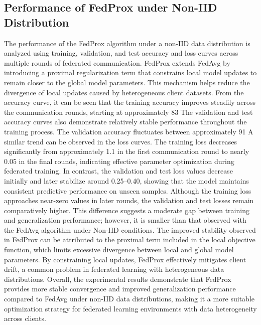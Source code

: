 \documentclass[12pt]{book}
\begin{document}
\subsection{ Performance of FedProx under Non-IID Distribution}
The performance of the FedProx algorithm under a non-IID data distribution is analyzed using training, validation, and test accuracy and loss curves across multiple rounds of federated communication. FedProx extends FedAvg by introducing a proximal regularization term that constrains local model updates to remain closer to the global model parameters. This mechanism helps reduce the divergence of local updates caused by heterogeneous client datasets.
From the accuracy curve, it can be seen that the training accuracy improves steadily across the communication rounds, starting at approximately 83%
The validation and test accuracy curves also demonstrate relatively stable performance throughout the training process. The validation accuracy fluctuates between approximately 91%
A similar trend can be observed in the loss curves. The training loss decreases significantly from approximately 1.1 in the first communication round to nearly 0.05 in the final rounds, indicating effective parameter optimization during federated training. In contrast, the validation and test loss values decrease initially and later stabilize around 0.25–0.40, showing that the model maintains consistent predictive performance on unseen samples.
Although the training loss approaches near-zero values in later rounds, the validation and test losses remain comparatively higher. This difference suggests a moderate gap between training and generalization performance; however, it is smaller than that observed with the FedAvg algorithm under Non-IID conditions. The improved stability observed in FedProx can be attributed to the proximal term included in the local objective function, which limits excessive divergence between local and global model parameters. By constraining local updates, FedProx effectively mitigates client drift, a common problem in federated learning with heterogeneous data distributions.
Overall, the experimental results demonstrate that FedProx provides more stable convergence and improved generalization performance compared to FedAvg under non-IID data distributions, making it a more suitable optimization strategy for federated learning environments with data heterogeneity across clients.
\end{document}
